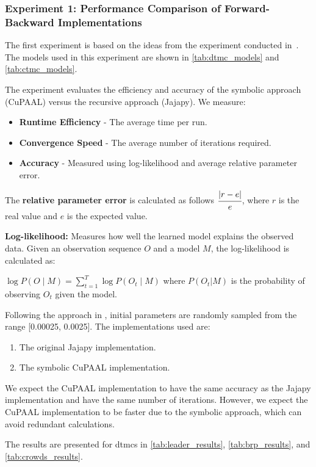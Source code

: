 \subsubsection{Experiment 1: Performance Comparison of Forward-Backward Implementations}
The first experiment is based on the ideas from the experiment conducted in~\cite{reynouard2024learning}.
The models used in this experiment are shown in \autoref{tab:dtmc_models} and \autoref{tab:ctmc_models}.

The experiment evaluates the efficiency and accuracy of the symbolic approach (CuPAAL) versus the recursive approach (Jajapy). We measure:
\begin{itemize}
    \item \textbf{Runtime Efficiency} - The average time per run.
    \item \textbf{Convergence Speed} - The average number of iterations required.
    \item \textbf{Accuracy} - Measured using log-likelihood and average relative parameter error.
\end{itemize}

The \textbf{relative parameter error} is calculated as follows $\cfrac{|r-e|}{e}$, where $r$ is the real value and $e$ is the expected value.

\textbf{Log-likelihood:} Measures how well the learned model explains the observed data. Given an observation sequence $O$ and a model $M$, the log-likelihood is calculated as:

$\log P(O \mid M) = \sum_{t=1}^{T} \log P(O_t \mid M)$ where $P(O_t|M)$ is the probability of observing $O_t$ given the model.

Following the approach in \cite{bacci2023mm}, initial parameters are randomly sampled from the range
    [0.00025, 0.0025]. The implementations used are:
\begin{enumerate}
    \item The original Jajapy implementation.
    \item The symbolic CuPAAL implementation.
\end{enumerate}

We expect the CuPAAL implementation to have the same accuracy as the Jajapy implementation and have the same number of iterations. However, we expect the CuPAAL implementation to be faster due to the symbolic approach, which can avoid redundant calculations.

The results are presented for \glspl{dtmc} in \autoref{tab:leader_results}, \autoref{tab:brp_results}, and \autoref{tab:crowds_results}.

